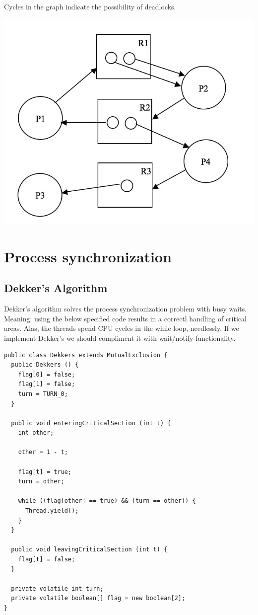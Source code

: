 \documentclass[a4paper]{article}
\begin{document}
Cycles in the graph indicate the possibility of deadlocks.
\begin{center}
  \includegraphics[scale=0.2]{res_alloc}
\end{center}

\section{Process synchronization}
\subsection{Dekker's Algorithm}
Dekker's algorithm solves the process synchronization problem with busy waits.
Meaning: using the below specified code results in a correctl handling of
critical areas. Alas, the threads spend CPU cycles in the while loop, needlessly.
If we implement Dekker's we should compliment it with wait/notify functionality.

\begin{lstlisting}[label=dekkers,caption=Dekker's Algorithm]
public class Dekkers extends MutualExclusion {
  public Dekkers () {
    flag[0] = false;
    flag[1] = false;
    turn = TURN_0;
  }

  public void enteringCriticalSection (int t) {
    int other;

    other = 1 - t;

    flag[t] = true;
    turn = other;

    while ((flag[other] == true) && (turn == other)) {
      Thread.yield();
    }
  }

  public void leavingCriticalSection (int t) {
    flag[t] = false;
  }

  private volatile int turn;
  private volatile boolean[] flag = new boolean[2];
}
\end{lstlisting}
\end{document}
